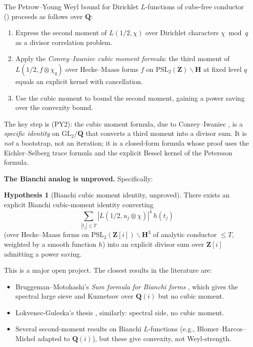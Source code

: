 \documentclass[11pt]{article}
\theoremstyle{definition}
\newtheorem{hypothesis}[theorem]{Hypothesis}
\newcommand{\Z}{\mathbf{Z}}
\newcommand{\Q}{\mathbf{Q}}
\newcommand{\HH}{\mathbf{H}}
\newcommand{\Zi}{\Z[i]}
\begin{document}
The Petrow--Young Weyl bound for Dirichlet $L$-functions of cube-free conductor (\cite{petrow-young}) proceeds as follows over $\Q$:

\begin{enumerate}[label=(PY\arabic*)]
\item Express the second moment of $L(1/2,\chi)$ over Dirichlet characters $\chi\bmod q$ as a divisor correlation problem.
\item Apply the \emph{Conrey--Iwaniec cubic moment formula}: the third moment of $L(1/2,f\otimes\chi_q)$ over Hecke--Maass forms $f$ on $\mathrm{PSL}_2(\Z)\backslash\HH$ at fixed level $q$ equals an explicit kernel with cancellation.
\item Use the cubic moment to bound the second moment, gaining a power saving over the convexity bound.
\end{enumerate}

The key step is (PY2): the cubic moment formula, due to Conrey--Iwaniec \cite{conrey-iwaniec}, is a \emph{specific identity} on $\mathrm{GL}_2/\Q$ that converts a third moment into a divisor sum. It is \emph{not} a bootstrap, not an iteration; it is a closed-form formula whose proof uses the Eichler--Selberg trace formula and the explicit Bessel kernel of the Petersson formula.

\textbf{The Bianchi analog is unproved.} Specifically:

\begin{hypothesis}[Bianchi cubic moment identity, unproved]\label{hyp:cubic}
There exists an explicit Bianchi cubic-moment identity converting
\[
\sum_{|t_j|\le T}|L(1/2,u_j\otimes\chi)|^4\,h(t_j)
\]
(over Hecke--Maass forms on $\mathrm{PSL}_2(\Zi)\backslash\HH^3$ of analytic conductor $\le T$, weighted by a smooth function $h$) into an explicit divisor sum over $\Zi$ admitting a power saving.
\end{hypothesis}

This is a major open project. The closest results in the literature are:
\begin{itemize}
\item Bruggeman--Motohashi's \emph{Sum formula for Bianchi forms} \cite{BMot}, which gives the spectral large sieve and Kuznetsov over $\Q(i)$ but no cubic moment.
\item Lokvenec-Guleska's thesis \cite{LG}, similarly: spectral side, no cubic moment.
\item Several second-moment results on Bianchi $L$-functions (e.g., Blomer--Harcos--Michel \cite{BHM} adapted to $\Q(i)$), but these give convexity, not Weyl-strength.
\end{itemize}
\end{document}
